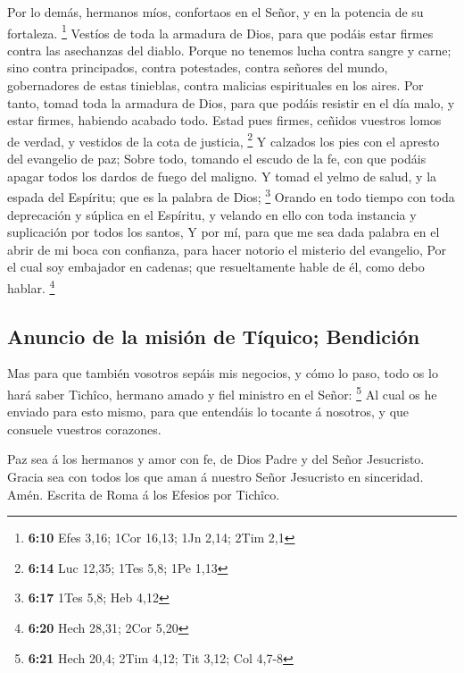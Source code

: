  Por lo demás, hermanos míos, confortaos en el Señor, y
en la potencia de su fortaleza. \footnote{\textbf{6:10} Efes 3,16; 1Cor
  16,13; 1Jn 2,14; 2Tim 2,1}  Vestíos de toda la armadura
de Dios, para que podáis estar firmes contra las asechanzas del diablo.
 Porque no tenemos lucha contra sangre y carne; sino
contra principados, contra potestades, contra señores del mundo,
gobernadores de estas tinieblas, contra malicias espirituales en los
aires.  Por tanto, tomad toda la armadura de Dios, para
que podáis resistir en el día malo, y estar firmes, habiendo acabado
todo.  Estad pues firmes, ceñidos vuestros lomos de
verdad, y vestidos de la cota de justicia, \footnote{\textbf{6:14} Luc
  12,35; 1Tes 5,8; 1Pe 1,13}  Y calzados los pies con el
apresto del evangelio de paz;  Sobre todo, tomando el
escudo de la fe, con que podáis apagar todos los dardos de fuego del
maligno.  Y tomad el yelmo de salud, y la espada del
Espíritu; que es la palabra de Dios; \footnote{\textbf{6:17} 1Tes 5,8;
  Heb 4,12}  Orando en todo tiempo con toda deprecación y
súplica en el Espíritu, y velando en ello con toda instancia y
suplicación por todos los santos,  Y por mí, para que me
sea dada palabra en el abrir de mi boca con confianza, para hacer
notorio el misterio del evangelio,  Por el cual soy
embajador en cadenas; que resueltamente hable de él, como debo hablar.
\footnote{\textbf{6:20} Hech 28,31; 2Cor 5,20}

\hypertarget{anuncio-de-la-misiuxf3n-de-tuxedquico-bendiciuxf3n}{%
\subsection{Anuncio de la misión de Tíquico;
Bendición}\label{anuncio-de-la-misiuxf3n-de-tuxedquico-bendiciuxf3n}}

 Mas para que también vosotros sepáis mis negocios, y
cómo lo paso, todo os lo hará saber Tichîco, hermano amado y fiel
ministro en el Señor: \footnote{\textbf{6:21} Hech 20,4; 2Tim 4,12; Tit
  3,12; Col 4,7-8}  Al cual os he enviado para esto
mismo, para que entendáis lo tocante á nosotros, y que consuele vuestros
corazones.

 Paz sea á los hermanos y amor con fe, de Dios Padre y
del Señor Jesucristo.  Gracia sea con todos los que aman
á nuestro Señor Jesucristo en sinceridad. Amén. Escrita de Roma á los
Efesios por Tichîco.
